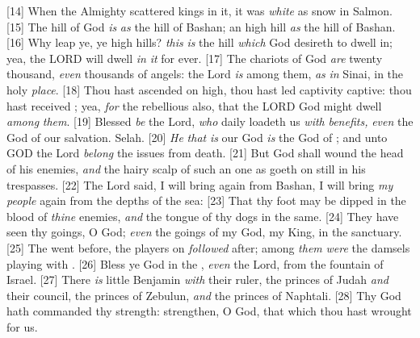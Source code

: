 [14] \textcolor[cmyk]{0.99998,1,0,0}{When the Almighty scattered kings in it, it was \emph{white} as snow in Salmon.}
[15] \textcolor[cmyk]{0.99998,1,0,0}{The hill of God \emph{is} \emph{as} the hill of Bashan; an high hill \emph{as} the hill of Bashan.}
[16] \textcolor[cmyk]{0.99998,1,0,0}{Why leap ye, ye high hills? \emph{this} \emph{is} the hill \emph{which} God desireth to dwell in; yea, the LORD will dwell \emph{in} \emph{it} for ever.}
[17] \textcolor[cmyk]{0.99998,1,0,0}{The chariots of God \emph{are} twenty thousand, \emph{even} thousands of angels: the Lord \emph{is} among them, \emph{as} \emph{in} Sinai, in the holy \emph{place}.}
[18] \textcolor[cmyk]{0.99998,1,0,0}{Thou hast ascended on high, thou hast led captivity captive: thou hast received  ; yea, \emph{for} the rebellious also, that the LORD God might dwell \emph{among} \emph{them}.}
[19] \textcolor[cmyk]{0.99998,1,0,0}{Blessed \emph{be} the Lord, \emph{who} daily loadeth us \emph{with} \emph{benefits,} \emph{even} the God of our salvation. Selah.}
[20] \textcolor[cmyk]{0.99998,1,0,0}{\emph{He} \emph{that} \emph{is} our God \emph{is} the God of  ; and unto GOD the Lord \emph{belong} the issues from death.}
[21] \textcolor[cmyk]{0.99998,1,0,0}{But God shall wound the head of his enemies, \emph{and} the hairy scalp of such an one as goeth on still in his trespasses.}
[22] \textcolor[cmyk]{0.99998,1,0,0}{The Lord said, I will bring again from Bashan, I will bring \emph{my} \emph{people} again from the depths of the sea:}
[23] \textcolor[cmyk]{0.99998,1,0,0}{That thy foot may be dipped in the blood of \emph{thine} enemies, \emph{and} the tongue of thy dogs in the same.}
[24] \textcolor[cmyk]{0.99998,1,0,0}{They have seen thy goings, O God; \emph{even} the goings of my God, my King, in the sanctuary.}
[25] \textcolor[cmyk]{0.99998,1,0,0}{The   went before, the players on   \emph{followed} after; among \emph{them} \emph{were} the damsels playing with  .}
[26] \textcolor[cmyk]{0.99998,1,0,0}{Bless ye God in the , \emph{even} the Lord, from the fountain of Israel.}
[27] \textcolor[cmyk]{0.99998,1,0,0}{There \emph{is} little Benjamin \emph{with} their ruler, the princes of Judah \emph{and} their council, the princes of Zebulun, \emph{and} the princes of Naphtali.}
[28] \textcolor[cmyk]{0.99998,1,0,0}{Thy God hath commanded thy strength: strengthen, O God, that which thou hast wrought for us.}
